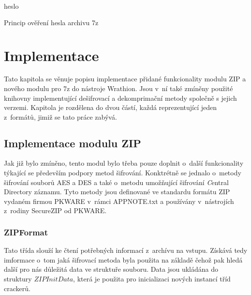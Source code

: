 \begin{algorithm}[!h]
    \SetStartEndCondition{ (}{)}{)}\SetAlgoBlockMarkers{}{}%
    \AlgoDisplayBlockMarkers\SetAlgoNoLine%
    \DontPrintSemicolon
    \Return heslo\;
    \caption{Princip ověření hesla archivu 7z}
    \label{alg:7z_desifr}
\end{algorithm}
    
\chapter{Implementace}
\label{ch:implementace}
Tato kapitola se věnuje popisu implementace přidané funkcionality modulu ZIP a nového modulu pro
7z do nástroje Wrathion. Jsou v~ní také zmíněny použité knihovny implementující dešifrovací a
dekomprimační metody společně s jejich verzemi. Kapitola je rozdělena do dvou částí, každá
reprezentující jeden z~formátů, jimiž se tato práce zabývá.

\section{Implementace modulu ZIP}
Jak již bylo zmíněno, tento modul bylo třeba pouze doplnit o~další funkcionality týkající se 
především podpory metod šifrování. Konktrétně se jednalo o~metody šifrování souborů AES a DES a také
o~metodu umožňující šifrování {\textit Central Directory} záznamu. Tyto metody jsou definované ve
standardu formátu ZIP vydaném firmou PKWARE v~rámci APPNOTE.txt a používány
v~nástrojích z~rodiny SecureZIP od PKWARE.

\subsection{ZIPFormat}
Tato třída slouží ke čtení potřebných informací z~archívu na vstupu. Získává tedy imformace o~tom
jaká šifrovací metoda byla použita na základě čehož pak hledá další pro nás důležitá data ve
struktuře souboru. Data jsou ukládána do struktury $ZIPInitData$, která je použita pro
inicializaci nových instancí tříd crackerů. 

